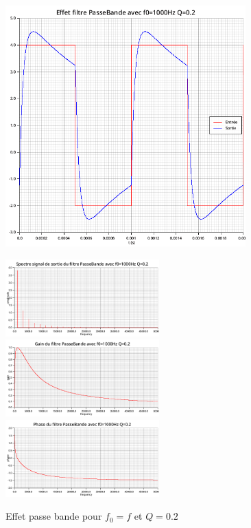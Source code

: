 \documentclass{article}
\begin{document}
\begin{figure}[H]
  \begin{minipage}{0.6\textwidth}
      \centering
      \includegraphics[width=25em]{images/creneau/bande/q=0.2/1/signals.png}
  \end{minipage}
  \begin{minipage}{0.3\textwidth}
      \centering
      \includegraphics[width=16em]{images/creneau/bande/q=0.2/1/fft_out.png}
      \vfill
      \includegraphics[width=16em]{images/creneau/bande/q=0.2/1/gain.png}
      \vfill
      \includegraphics[width=16em]{images/creneau/bande/q=0.2/1/phase.png}
  \end{minipage}
  \caption{Effet passe bande pour $f_0=f$ et $Q=0.2$}
\end{figure}
\end{document}
